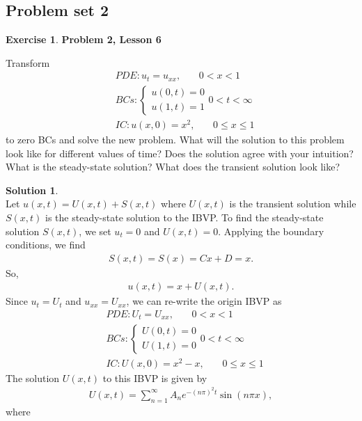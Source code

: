 \documentclass{article}
\theoremstyle{definition}
\newtheorem*{exer*}{Exercise}
\newtheorem*{sln*}{Solution}
\begin{document}
\newpage
\subsection{Problem set 2}


\begin{exer*}\textbf{Problem 2, Lesson 6}
	
	\noindent Transform
	\begin{align*}
	&PDE: u_t = u_{xx},\,\,\,\,\,\,\,\,\,\,\, 0<x<1\\
	&BCs:  
	\begin{cases}
	u(0,t) = 0\\
	u(1,t) = 1
	\end{cases} 0 < t < \infty\\
	&IC: u(x,0) = x^2,\,\,\,\,\,\,\,\,\,\,\, 0 \leq x\leq 1
	\end{align*}
	to zero BCs and solve the new problem. What will the solution to this problem look like for different values of time? Does the solution agree with your intuition? What is the steady-state solution? What does the transient solution look like?
	\begin{sln*}
		$\,$\\
		Let $u(x,t) = U(x,t) + S(x,t)$ where $U(x,t)$ is the transient solution while $S(x,t)$ is the steady-state solution to the IBVP. To find the steady-state solution $S(x,t)$, we set $u_t = 0$ and $U(x,t) = 0$. Applying the boundary conditions, we find 
		\begin{align*}
		S(x,t) = S(x) = Cx+D = x.
		\end{align*}
		So,
		\begin{align*}
		u(x,t) = x + U(x,t).
		\end{align*}
		Since $u_t = U_t$ and $u_{xx} = U_{xx}$, we can re-write the origin IBVP as
		\begin{align*}
		&PDE: U_t = U_{xx},\,\,\,\,\,\,\,\,\,\,\, 0<x<1\\
		&BCs:  
		\begin{cases}
		U(0,t) = 0\\
		U(1,t) = 0
		\end{cases} 0 < t < \infty\\
		&IC: U(x,0) = x^2 - x,\,\,\,\,\,\,\,\,\,\,\, 0 \leq x\leq 1
		\end{align*}
		The solution $U(x,t)$ to this IBVP is given by
		\begin{align*}
		U(x,t) = \sum^\infty_{n=1}A_n e^{-(n\pi)^2t} \sin(n\pi x),
		\end{align*}
		where
		\begin{align*}

\end{align*}
\end{sln*}
\end{exer*}
\end{document}
